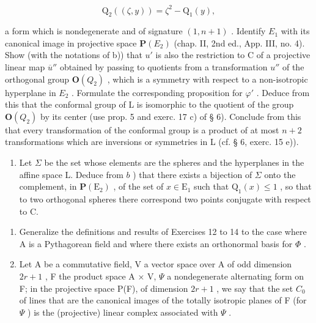 \[
\mathrm{Q} _ {2} ((\zeta , y)) = \zeta^ {2} - \mathrm{Q} _ {1} (y),
\]

a form which is nondegenerate and of signature \((1, n + 1)\) . Identify \(E_{1}\) with its canonical image in projective space \(\mathbf{P}(E_{2})\) (chap. II, 2nd ed., App. III, no. 4). Show (with the notations of b)) that \(u'\) is also the restriction to C of a projective linear map \(\overline{u}''\) obtained by passing to quotients from a transformation \(u''\) of the orthogonal group \(\mathbf{O}(Q_{2})\) , which is a symmetry with respect to a non-isotropic hyperplane in \(E_{2}\) . Formulate the corresponding proposition for \(\varphi'\) . Deduce from this that the conformal group of L is isomorphic to the quotient of the group \(\mathbf{O}(Q_{2})\) by its center (use prop. 5 and exerc. 17 c) of § 6). Conclude from this that every transformation of the conformal group is a product of at most \(n + 2\) transformations which are inversions or symmetries in L (cf. § 6, exerc. 15 e)).

\begin{enumerate}
\def\labelenumi{\alph{enumi})}
\setcounter{enumi}{3}
\tightlist
\item
  Let \(\Sigma\) be the set whose elements are the spheres and the hyperplanes in the affine space L. Deduce from \(b\) ) that there exists a bijection of \(\Sigma\) onto the complement, in \(\mathbf{P}(\mathrm{E}_2)\) , of the set of \(x \in \mathrm{E}_1\) such that \(\mathrm{Q}_1(x) \leqslant 1\) , so that to two orthogonal spheres there correspond two points conjugate with respect to C.
\end{enumerate}

\begin{enumerate}
\def\labelenumi{\arabic{enumi})}
\setcounter{enumi}{14}
\item
  Generalize the definitions and results of Exercises 12 to 14 to the case where A is a Pythagorean field and where there exists an orthonormal basis for \(\Phi\) .
\item
  Let A be a commutative field, V a vector space over A of odd dimension \(2r + 1\) , F the product space A × V, \(\Psi\) a nondegenerate alternating form on F; in the projective space P(F), of dimension \(2r + 1\) , we say that the set \(C_{0}\) of lines that are the canonical images of the totally isotropic planes of F (for \(\Psi\) ) is the (projective) linear complex associated with \(\Psi\) .
\end{enumerate}

